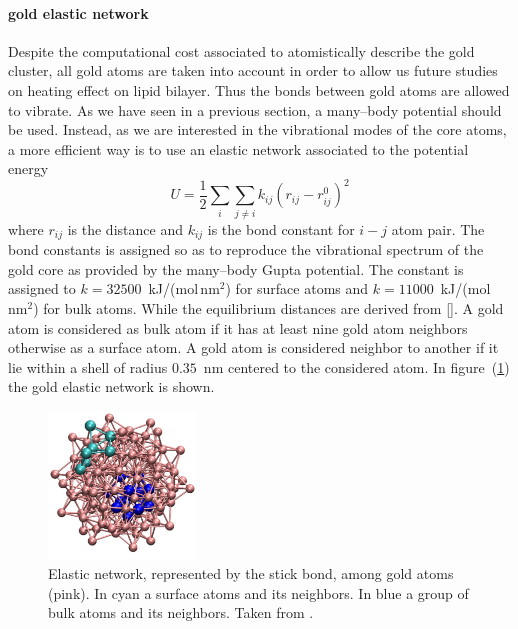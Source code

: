 \paragraph{\textbf{gold elastic network}} Despite the computational cost associated to atomistically describe the gold cluster, all gold atoms are taken into account in order to allow us future studies on heating effect on lipid bilayer. Thus the bonds between gold atoms are allowed to vibrate. As we have seen in a previous section, a many--body potential should be used. Instead, as we are interested in the vibrational modes of the core atoms, 
a more efficient way is to use an elastic network associated to the potential energy
\begin{equation*}
	U = \frac{1}{2}\sum_i \sum_{j\ne i}k_{ij}(r_{ij} - r_{ij}^0)^2
\end{equation*}
where $r_{ij}$ is the distance and $k_{ij}$ is the bond constant for $i-j$ atom pair. The bond constants is assigned so as to reproduce the vibrational spectrum of the gold core as provided by the many--body Gupta potential. The constant is assigned to $k = 32500$~kJ/(mol\,nm$^2$) for surface atoms and $k = 11000$~kJ/(mol\,nm$^2$) for bulk atoms. While the equilibrium distances are derived from []. A gold atom is considered as bulk atom if it has at least nine gold atom neighbors otherwise as a surface atom. A gold atom is considered neighbor to another if it lie within a shell of radius $0.35$~nm centered to the considered atom. In figure~(\ref{fig:goldNetwork}) the gold elastic network is shown.
\begin{figure}
	\centering
	\includegraphics[width=0.35\textwidth]{./img/goldNetwork}
	\caption{Elastic network, represented by the stick bond, among gold atoms (pink). In cyan a surface atoms and its neighbors. In blue a group of bulk atoms and its neighbors. Taken from \cite{simonelliThesis}.}
	\label{fig:goldNetwork}
\end{figure}

